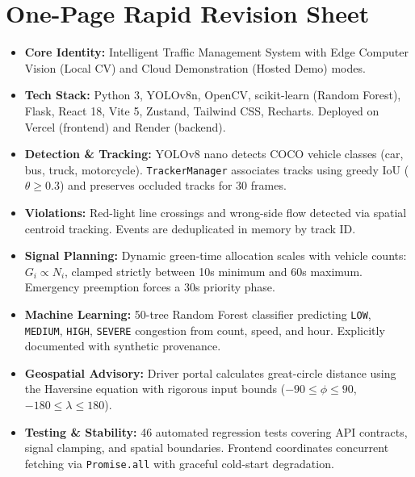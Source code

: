 \documentclass[11pt,a4paper,oneside]{report}
\begin{document}
\section{One-Page Rapid Revision Sheet}
\label{sec:glossary_rapid_sheet}

\begin{tcolorbox}[colback=slate!5,colframe=navy,title=\textbf{BENGALURUTRAFFICAI --- ONE-PAGE RAPID REVISION SHEET}]
\small
\begin{itemize}[leftmargin=*]
    \item \textbf{Core Identity:} Intelligent Traffic Management System with Edge Computer Vision (Local CV) and Cloud Demonstration (Hosted Demo) modes.
    \item \textbf{Tech Stack:} Python 3, YOLOv8n, OpenCV, scikit-learn (Random Forest), Flask, React 18, Vite 5, Zustand, Tailwind CSS, Recharts. Deployed on Vercel (frontend) and Render (backend).
    \item \textbf{Detection \& Tracking:} YOLOv8 nano detects COCO vehicle classes (car, bus, truck, motorcycle). \texttt{TrackerManager} associates tracks using greedy IoU ($\theta \ge 0.3$) and preserves occluded tracks for 30 frames.
    \item \textbf{Violations:} Red-light line crossings and wrong-side flow detected via spatial centroid tracking. Events are deduplicated in memory by track ID.
    \item \textbf{Signal Planning:} Dynamic green-time allocation scales with vehicle counts: $G_i \propto N_i$, clamped strictly between 10s minimum and 60s maximum. Emergency preemption forces a 30s priority phase.
    \item \textbf{Machine Learning:} 50-tree Random Forest classifier predicting \texttt{LOW}, \texttt{MEDIUM}, \texttt{HIGH}, \texttt{SEVERE} congestion from count, speed, and hour. Explicitly documented with synthetic provenance.
    \item \textbf{Geospatial Advisory:} Driver portal calculates great-circle distance using the Haversine equation with rigorous input bounds ($-90 \le \phi \le 90$, $-180 \le \lambda \le 180$).
    \item \textbf{Testing \& Stability:} 46 automated regression tests covering API contracts, signal clamping, and spatial boundaries. Frontend coordinates concurrent fetching via \texttt{Promise.all} with graceful cold-start degradation.
\end{itemize}
\end{tcolorbox}
\end{document}
